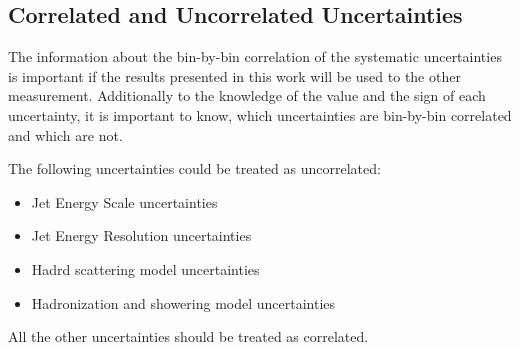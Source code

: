 \subsection{Correlated and Uncorrelated Uncertainties}

The information about the bin-by-bin correlation of the systematic uncertainties is important if the results presented in this work
will be used to the other measurement. Additionally to the knowledge of the value and the sign of each uncertainty, it is important 
to know, which uncertainties are bin-by-bin correlated and which are not.

The following uncertainties could be treated as uncorrelated:

\begin{itemize}
 \item Jet Energy Scale uncertainties
 \item Jet Energy Resolution uncertainties
 \item Hadrd scattering model uncertainties
 \item Hadronization and showering model uncertainties
\end{itemize}

All the other uncertainties should be treated as correlated.

